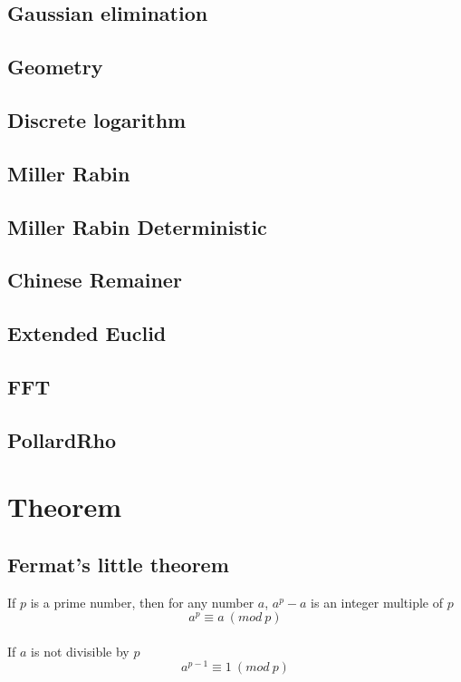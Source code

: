 \documentclass[A4 paper, 12pt, oneside, landscape]{article}
\begin{document}
\begin{multicols}{2}
	\subsection{Gaussian elimination}
		    

	\subsection{Geometry}
	
	
	\subsection{Discrete logarithm}
	
	
	\subsection{Miller Rabin}
	
	
	\subsection{Miller Rabin Deterministic}
	

	\subsection{Chinese Remainer}
	
	
	\subsection{Extended Euclid}
	

	\subsection{FFT}
	

	\subsection{PollardRho}
	

\section{Theorem}
	\subsection{Fermat's little theorem}
	If $p$ is a prime number, then for any number $a$, \(a^p - a\) is an integer multiple of $p$ \\
	\[a ^ p \equiv a \ (mod \ p)\]  \\
	If $a$ is not divisible by $p$ \\
	\[a ^ {p - 1} \equiv 1 \ (mod \ p)\] 
	

\end{multicols}
\end{document}
